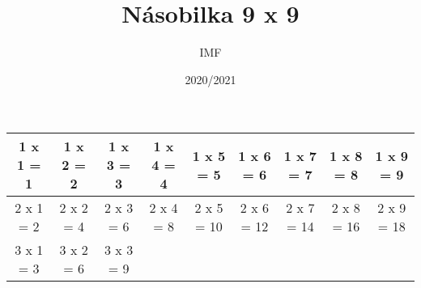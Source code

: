 \documentclass[a4paper,landscape,11pt]{article}
\title{Násobilka 9 x 9}
\author{IMF}
\date{2020/2021}
\begin{document}
\maketitle

\begin{tabular}{|c|c|c|c|c|c|c|c|c|}
  \hline
  
  
  1 x 1 = 1
  
  &
  
  
  1 x 2 = 2
  
  &
  
  
  1 x 3 = 3
  
  &
  
  
  1 x 4 = 4
  
  &
  
  
  1 x 5 = 5
  
  &
  
  
  1 x 6 = 6
  
  &
  
  
  1 x 7 = 7
  
  &
  
  
  1 x 8 = 8
  
  &
  
  
  1 x 9 = 9
  
  
  \\ \hline
  
  
  2 x 1 = 2
  
  &
  
  
  2 x 2 = 4
  
  &
  
  
  2 x 3 = 6
  
  &
  
  
  2 x 4 = 8
  
  &
  
  
  2 x 5 = 10
  
  &
  
  
  2 x 6 = 12
  
  &
  
  
  2 x 7 = 14
  
  &
  
  
  2 x 8 = 16
  
  &
  
  
  2 x 9 = 18
  
  
  \\ \hline
  
  
  3 x 1 = 3
  
  &
  
  
  3 x 2 = 6
  
  &
  
  
  3 x 3 = 9
  

\end{tabular}
\end{document}
